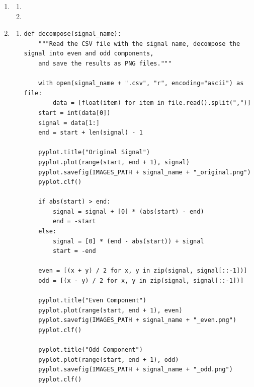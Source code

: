 \documentclass[10pt,a4paper, margin=1in]{article}
\begin{document}
\begin{enumerate}
\item %
    \begin{enumerate}
    \item %
    \item %
    \end{enumerate}
    
\item %
    \begin{enumerate}
    \item \hfill\begin{verbatim}
def decompose(signal_name):
    """Read the CSV file with the signal name, decompose the signal into even and odd components,
    and save the results as PNG files."""

    with open(signal_name + ".csv", "r", encoding="ascii") as file:
        data = [float(item) for item in file.read().split(",")]
    start = int(data[0])
    signal = data[1:]
    end = start + len(signal) - 1

    pyplot.title("Original Signal")
    pyplot.plot(range(start, end + 1), signal)
    pyplot.savefig(IMAGES_PATH + signal_name + "_original.png")
    pyplot.clf()

    if abs(start) > end:
        signal = signal + [0] * (abs(start) - end)
        end = -start
    else:
        signal = [0] * (end - abs(start)) + signal
        start = -end

    even = [(x + y) / 2 for x, y in zip(signal, signal[::-1])]
    odd = [(x - y) / 2 for x, y in zip(signal, signal[::-1])]

    pyplot.title("Even Component")
    pyplot.plot(range(start, end + 1), even)
    pyplot.savefig(IMAGES_PATH + signal_name + "_even.png")
    pyplot.clf()

    pyplot.title("Odd Component")
    pyplot.plot(range(start, end + 1), odd)
    pyplot.savefig(IMAGES_PATH + signal_name + "_odd.png")
    pyplot.clf()
\end{verbatim}


\end{enumerate}
\end{enumerate}
\end{document}
